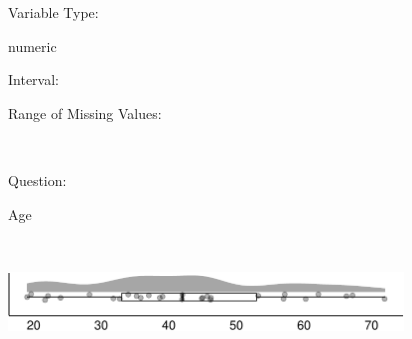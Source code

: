 \documentclass[
]{article}
\begin{document}
\begin{minipage}[t]{0.3\linewidth}

Variable Type:

\end{minipage}%
\begin{minipage}[t]{0.7\linewidth}

numeric

\end{minipage}

\begin{minipage}[t]{0.3\linewidth}

Interval:

\end{minipage}%
\begin{minipage}[t]{0.7\linewidth}

\end{minipage}

\begin{minipage}[t]{0.3\linewidth}

Range of Missing Values:

\end{minipage}%
\begin{minipage}[t]{0.7\linewidth}

~

\end{minipage}

\begin{minipage}[t]{0.3\linewidth}

Question:

\end{minipage}%
\begin{minipage}[t]{0.7\linewidth}

Age

\end{minipage}

\begin{minipage}[t]{0.3\linewidth}

~

\end{minipage}%
\begin{minipage}[t]{0.7\linewidth}

\includegraphics[width=396px]{codebook_template_files/figure-latex/q2_rainplot-1}

\end{minipage}
 \vspace*{0.5mm} 
\end{document}
